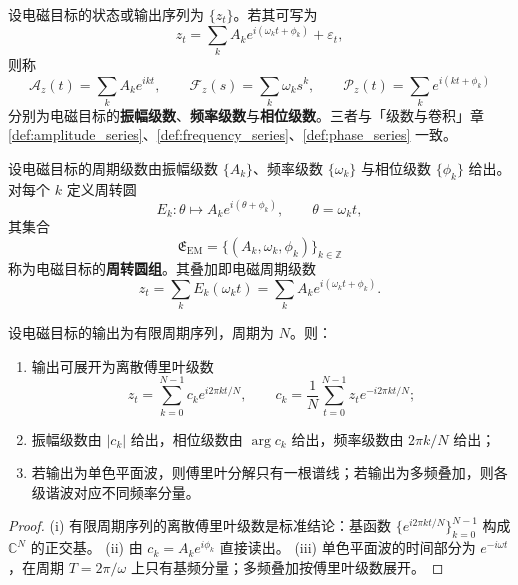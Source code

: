 \begin{definition}\label{def:em_series}
设电磁目标的状态或输出序列为 $\{z_t\}$。若其可写为
\[
z_t=\sum_k A_k e^{i(\omega_k t+\phi_k)}+\varepsilon_t,
\]
则称
\[
\mathcal A_z(t)=\sum_k A_k e^{ikt},\qquad
\mathcal F_z(s)=\sum_k \omega_k s^k,\qquad
\mathcal P_z(t)=\sum_k e^{i(kt+\phi_k)}
\]
分别为电磁目标的\textbf{振幅级数}、\textbf{频率级数}与\textbf{相位级数}。三者与「级数与卷积」章 \cref{def:amplitude_series}、\cref{def:frequency_series}、\cref{def:phase_series} 一致。
\end{definition}

\begin{definition}[电磁周转圆组]\label{def:em_epicycle_group}
设电磁目标的周期级数由振幅级数 $\{A_k\}$、频率级数 $\{\omega_k\}$ 与相位级数 $\{\phi_k\}$ 给出。对每个 $k$ 定义周转圆
\[
E_k:\theta\mapsto A_k e^{i(\theta+\phi_k)},\qquad \theta=\omega_k t,
\]
其集合
\[
\mathfrak E_{\mathrm{EM}}=\{(A_k,\omega_k,\phi_k)\}_{k\in\mathbb Z}
\]
称为电磁目标的\textbf{周转圆组}。其叠加即电磁周期级数
\[
z_t=\sum_k E_k(\omega_k t)=\sum_k A_k e^{i(\omega_k t+\phi_k)}.
\]
\end{definition}

\begin{theorem}[由电磁数据构建周期级数]\label{thm:em_series_reconstruction}
设电磁目标的输出为有限周期序列，周期为 $N$。则：
\begin{enumerate}[label=(\roman*)]
    \item 输出可展开为离散傅里叶级数
    \[
    z_t=\sum_{k=0}^{N-1}c_k e^{i2\pi kt/N},\qquad
    c_k=\frac1N\sum_{t=0}^{N-1}z_t e^{-i2\pi kt/N};
    \]
    \item 振幅级数由 $|c_k|$ 给出，相位级数由 $\arg c_k$ 给出，频率级数由 $2\pi k/N$ 给出；
    \item 若输出为单色平面波，则傅里叶分解只有一根谱线；若输出为多频叠加，则各级谐波对应不同频率分量。
\end{enumerate}
\end{theorem}

\begin{proof}
(i) 有限周期序列的离散傅里叶级数是标准结论：基函数 $\{e^{i2\pi kt/N}\}_{k=0}^{N-1}$ 构成 $\mathbb C^N$ 的正交基。
(ii) 由 $c_k=A_k e^{i\phi_k}$ 直接读出。
(iii) 单色平面波的时间部分为 $e^{-i\omega t}$，在周期 $T=2\pi/\omega$ 上只有基频分量；多频叠加按傅里叶级数展开。
\end{proof}

